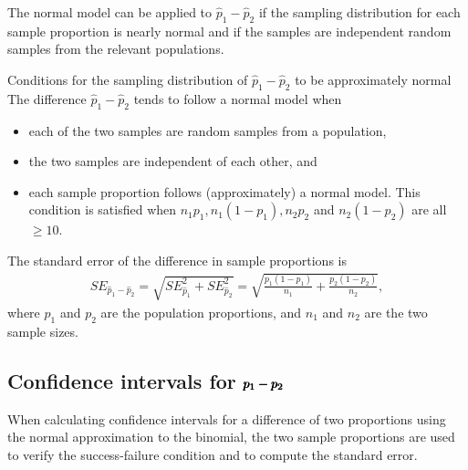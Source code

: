 The normal model can be applied to $\hat{p}_1 - \hat{p}_2$ if the sampling distribution for each sample proportion is nearly normal and if the samples are independent random samples from the relevant populations.

\begin{onebox}{Conditions for the sampling distribution of $\hat{p}_1 - \hat{p}_2$ to be approximately normal}
The difference $\hat{p}_1 - \hat{p}_2$ tends to follow a normal model when
\begin{itemize}
\setlength{\itemsep}{0mm}
\item each of the two samples are random samples from a population,
\item the two samples are independent of each other, and
\item each sample proportion follows (approximately) a normal model. This condition is satisfied when $n_1p_1, n_1(1 - p_1), n_2 p_2$ and $n_2(1 - p_2)$ are all $\geq 10$.
\end{itemize}
The standard error of the difference in sample proportions is
\begin{eqnarray}
SE_{\hat{p}_1 - \hat{p}_2}
	= \sqrt{SE_{\hat{p}_1}^2 + SE_{\hat{p}_2}^2}
	= \sqrt{\frac{p_1(1-p_1)}{n_1} + \frac{p_2(1-p_2)}{n_2}},
\label{seForDiffOfProp}
\end{eqnarray}
where $p_1$ and $p_2$ are the population proportions, and $n_1$ and $n_2$ are the two sample sizes.
\end{onebox}


\textD{\newpage}


\subsection{Confidence intervals for $\pmb{\MakeLowercase{p_1 - p_2}}$}
\label{confidenceIntervalsDifferenceProportions}

When calculating confidence intervals for a difference of two proportions using the normal approximation to the binomial, the two sample proportions are used to verify the success-failure condition and to compute the standard error.

